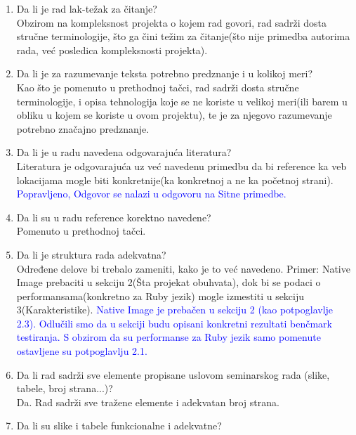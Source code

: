 \documentclass[a4paper]{report}
\newcommand{\odgovor}[1]{\textcolor{blue}{#1}}
\begin{document}
\begin{enumerate}
\item Da li je rad lak-težak za čitanje?\\
Obzirom na kompleksnost projekta o kojem rad govori, rad sadrži dosta stručne terminologije, što ga čini težim za čitanje(što nije primedba 
autorima rada, već posledica kompleksnosti projekta).

\item Da li je za razumevanje teksta potrebno predznanje i u kolikoj meri?\\
Kao što je pomenuto u prethodnoj tačci, rad sadrži dosta stručne terminologije, i opisa tehnologija koje se ne koriste u velikoj meri(ili barem 
u obliku u kojem se koriste u ovom projektu), te je za njegovo razumevanje potrebno značajno predznanje.

\item Da li je u radu navedena odgovarajuća literatura?\\
Literatura je odgovarajuća uz već navedenu primedbu da bi reference ka veb lokacijama mogle biti konkretnije(ka konkretnoj a ne ka početnoj 
strani). \odgovor{Popravljeno, Odgovor se nalazi u odgovoru na Sitne primedbe.}

\item Da li su u radu reference korektno navedene?\\
Pomenuto u prethodnoj tačci.

\item Da li je struktura rada adekvatna?\\
Određene delove bi trebalo zameniti, kako je to već navedeno. Primer: Native Image prebaciti u sekciju 2(Šta projekat obuhvata), dok bi se 
podaci o performansama(konkretno za Ruby jezik) mogle izmestiti u sekciju 3(Karakteristike). \odgovor{Native Image je prebačen u sekciju 2 (kao potpoglavlje 2.3). Odlučili smo da u sekciji budu opisani konkretni rezultati benčmark testiranja. S obzirom da su performanse za Ruby jezik samo pomenute ostavljene su potpoglavlju 2.1.}

\item Da li rad sadrži sve elemente propisane uslovom seminarskog rada (slike, tabele, broj strana...)?\\
Da. Rad sadrži sve tražene elemente i adekvatan broj strana. 

\item Da li su slike i tabele funkcionalne i adekvatne?\\


\end{enumerate}
\end{document}
